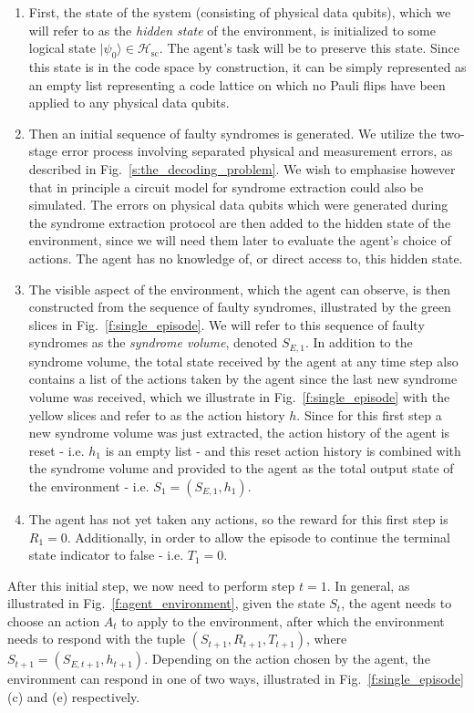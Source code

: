 \documentclass[twocolumn,preprintnumbers,amsmath,amssymb,notitlepage,nofootinbib,longbibliography,superscriptaddress,aps,pra,10pt]{revtex4-1}
\begin{document}
	\begin{enumerate}
		\item First, the state of the system (consisting of physical data qubits), which we will refer to as the \textit{hidden state} of the environment, is initialized to some logical state $|\psi_0\rangle \in \mathcal{H_\mathrm{sc}}$.
		The agent's task will be to preserve this state.
		Since this state is in the code space by construction, it can be simply represented as an empty list representing a code lattice on which no Pauli flips have been applied to any physical data qubits.
		\item Then an initial sequence of faulty syndromes is generated.
		We utilize the two-stage error process involving separated physical and measurement errors, as described in Fig.~\ref{s:the_decoding_problem}.
		We wish to emphasise however that in principle a circuit model for syndrome extraction could also be simulated.
		The errors on physical data qubits which were generated during the syndrome extraction protocol are then added to the hidden state of the environment, since we will need them later to evaluate the agent's choice of actions. 
		The agent has no knowledge of, or direct access to, this hidden state.
		\item The visible aspect of the environment, which the agent can observe, is then constructed from the sequence of faulty syndromes, illustrated by the green slices in Fig.~\ref{f:single_episode}.
		We will refer to this sequence of faulty syndromes as the \emph{syndrome volume}, denoted $S_{E,1}$.
		In addition to the syndrome volume, the total state received by the agent at any time step also contains a list of the actions taken by the agent since the last new syndrome volume was received, which we illustrate in Fig.~\ref{f:single_episode} with the yellow slices and refer to as the action history $h$.
		Since for this first step a new syndrome volume was just extracted, the action history of the agent is reset - i.e. $h_1$ is an empty list -  and this reset action history is combined with the syndrome volume and provided to the agent as the total output state of the environment - i.e. $S_1 = (S_{E,1},h_1)$.
		\item The agent has not yet taken any actions, so the reward for this first step is $R_1 =0$. 
		Additionally, in order to allow the episode to continue the terminal state indicator to false - i.e. $T_1=0$.
	\end{enumerate}

	After this initial step, we now need to perform step $t=1$.
	In general, as illustrated in Fig.~\ref{f:agent_environment}, given the state $S_t$, the agent needs to choose an action $A_t$ to apply to the environment, after which the environment needs to respond with the tuple $(S_{t+1}, R_{t+1}, T_{t+1})$, where $S_{t+1}=(S_{E,{t+1}},h_{t+1})$.
	Depending on the action chosen by the agent, the environment can respond in one of two ways, illustrated in Fig.~\ref{f:single_episode} (c) and (e) respectively.
\end{document}
